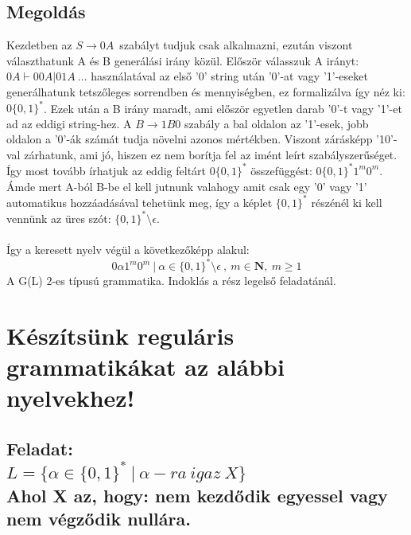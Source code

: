 \documentclass[12pt]{article}
\begin{document}
\subsection{Megoldás}
Kezdetben az $ S \rightarrow 0A $\ szabályt tudjuk csak alkalmazni, ezután viszont választhatunk A és B
generálási irány közül. 
Először válasszuk A irányt: $ 0A \vdash 00A| 01A \ ... $ használatával az első '0' string után
'0'-at vagy '1'-eseket generálhatunk tetszőleges sorrendben és mennyiségben, ez formalizálva így néz ki:
$ 0 \{0,1\}^* $. Ezek után a B irány maradt, ami először egyetlen darab '0'-t vagy '1'-et ad az eddigi string-hez.
A $ B \rightarrow 1B0 $ szabály a bal oldalon az '1'-esek, jobb oldalon a '0'-ák számát tudja növelni
azonos mértékben. Viszont zárásképp '10'-val zárhatunk, ami jó, hiszen ez nem borítja fel az imént leírt
szabályszerűséget. Így most tovább írhatjuk az eddig feltárt $ 0 \{0,1\}^* $ összefüggést:
$ 0 \{0,1\}^*1^m 0^m $. Ámde mert A-ból B-be el kell jutnunk valahogy amit csak egy '0' vagy '1' automatikus
hozzáadásával tehetünk meg, így a képlet $ \{0,1\}^* $ részénél ki kell vennünk az üres szót:
$ \{0,1\}^* \setminus \epsilon $. \\\\ 
Így a keresett nyelv végül a következőképp alakul:
$$ 0 \alpha 1^m 0^m \ | \ \alpha \in \{0,1\}^*\setminus\epsilon \ , \ m \in \mathbf{N}, \ m\geq 1 $$
A G(L) 2-es típusú grammatika. Indoklás a rész legelső feladatánál.


\section{Készítsünk reguláris grammatikákat az alábbi nyelvekhez!}
\subsection{Feladat: \\
$ L=\{ \alpha \in \{ 0,1 \}^* \ | \ \alpha-ra \ igaz \ X \} $ \\
Ahol X az, hogy: nem kezdődik egyessel vagy nem végződik nullára.}
\maketitle
\end{document}
